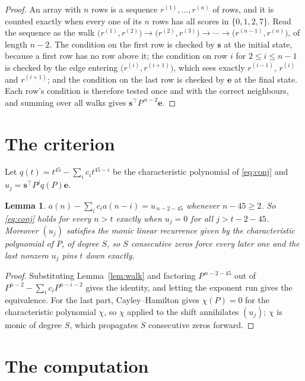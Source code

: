 \documentclass[11pt,a4paper]{article}
\theoremstyle{plain}
\newtheorem{lemma}[theorem]{Lemma}
\theoremstyle{definition}
\begin{document}
\begin{proof}
An array with $n$ rows is a sequence $r^{(1)},\dots,r^{(n)}$ of rows, and it is counted
exactly when every one of its $n$ rows has all scores in $\{0,1,2,7\}$. Read the sequence as the
walk $\bigl(r^{(1)},r^{(2)}\bigr)\to\bigl(r^{(2)},r^{(3)}\bigr)\to\cdots\to
\bigl(r^{(n-1)},r^{(n)}\bigr)$, of length $n-2$. The condition on the first row is
checked by $\mathbf{s}$ at the initial state, because a first row has no row above it; the
condition on row $i$ for $2\le i\le n-1$ is checked by the edge entering
$\bigl(r^{(i)},r^{(i+1)}\bigr)$, which sees exactly $r^{(i-1)}$, $r^{(i)}$ and
$r^{(i+1)}$; and the condition on the last row is checked by $\mathbf{e}$ at the final
state. Each row's condition is therefore tested once and with the correct neighbours, and
summing over all walks gives $\mathbf{s}^{\!\top}P^{\,n-2}\mathbf{e}$.
\end{proof}

\section{The criterion}

Let $q(t)=t^{45}-\sum_i c_i t^{45-i}$ be the characteristic polynomial of
\eqref{eq:conj} and $u_j=\mathbf{s}^{\!\top}P^{j}q(P)\mathbf{e}$.

\begin{lemma}\label{lem:crit}
$a(n)-\sum_i c_i a(n-i)=u_{\,n-2-45}$ whenever $n-45\ge2$. So \eqref{eq:conj}
holds for every $n>t$ exactly when $u_j=0$ for all $j>t-2-45$. Moreover $(u_j)$
satisfies the monic linear recurrence given by the characteristic polynomial of $P$, of
degree $S$, so $S$ consecutive zeros force every later one and the last nonzero $u_j$ pins
$t$ down exactly.
\end{lemma}

\begin{proof}
Substituting Lemma~\ref{lem:walk} and factoring $P^{\,n-2-45}$ out of
$P^{n-2}-\sum_i c_i P^{n-i-2}$ gives the identity, and letting the exponent run gives the
equivalence. For the last part, Cayley--Hamilton gives $\chi(P)=0$ for the characteristic
polynomial $\chi$, so $\chi$ applied to the shift annihilates $(u_j)$; $\chi$ is monic of
degree $S$, which propagates $S$ consecutive zeros forward.
\end{proof}

\section{The computation}
\end{document}
